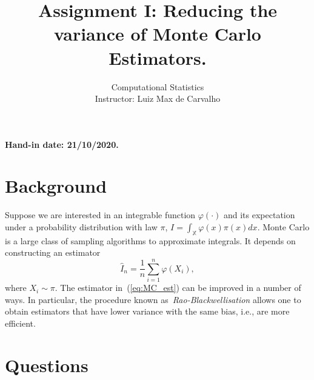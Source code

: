 \documentclass[a4paper,10pt, notitlepage]{report}
\title{Assignment I: Reducing the variance of Monte Carlo Estimators.}
\author{Computational Statistics \\ Instructor: Luiz Max de Carvalho}
\begin{document}
\maketitle

\textbf{Hand-in date: 21/10/2020.}


\section*{Background}

Suppose we are interested in an integrable function $\varphi(\cdot)$ and its expectation under a probability distribution with law $\pi$, $I = \int_{\mathbb{X}} \varphi(x) \pi(x) dx$.
Monte Carlo is a large class of sampling algorithms to approximate integrals.
It depends on constructing an estimator
\begin{equation}
\label{eq:MC_est}
 \hat{I}_n = \frac{1}{n} \sum_{i=1}^n \varphi(X_i),
\end{equation}
where $X_i \sim \pi$.
The estimator in~(\ref{eq:MC_est}) can be improved in a number of ways.
In particular, the procedure known as~\textit{Rao-Blackwellisation} allows one to obtain estimators that have lower variance with the same bias, i.e., are more efficient.

\section*{Questions}
\end{document}
